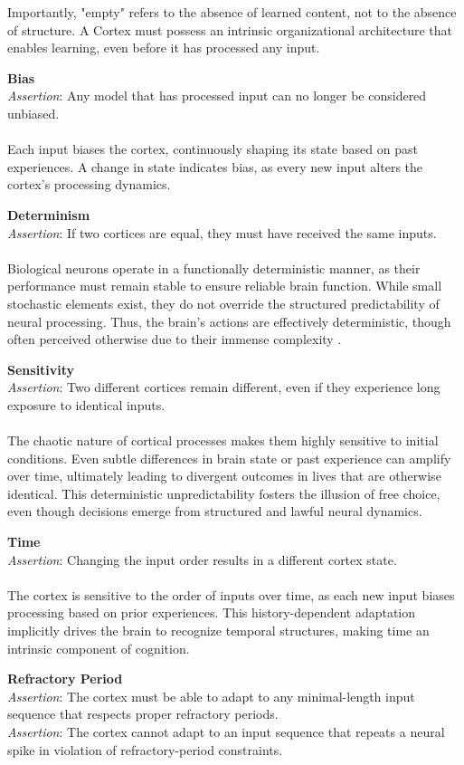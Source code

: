 \documentclass{article}
\newcommand{\agitbtest}[2]{
  \item
  \begin{minipage}[t]{\linewidth}
    \textbf{#1} \\[0.5ex]
    #2
  \end{minipage}
}
\begin{document}
\begin{agitblist}
{Importantly, "empty" refers to the absence of learned content, not to the absence of structure. A Cortex must possess an intrinsic organizational architecture that enables learning, even before it has processed any input.
}
\agitbtest{Bias}{
\emph{Assertion}: Any model that has processed input can no longer be considered unbiased.\\
\\
Each input biases the cortex, continuously shaping its state based on past experiences. A change in state indicates bias, as every new input alters the cortex's processing dynamics.
}
\agitbtest{Determinism}{
\emph{Assertion}: If two cortices are equal, they must have received the same inputs.\\
\\
Biological neurons operate in a functionally deterministic manner, as their performance must remain stable to ensure reliable brain function. While small stochastic elements exist, they do not override the structured predictability of neural processing. Thus, the brain's actions are effectively deterministic, though often perceived otherwise due to their immense complexity \cite{AtlanticFreeWill}.
}
\agitbtest{Sensitivity}{
\emph{Assertion}: Two different cortices remain different, even if they experience long exposure to identical inputs.\\
\\
The chaotic nature of cortical processes makes them highly sensitive to initial conditions. Even subtle differences in brain state or past experience can amplify over time, ultimately leading to divergent outcomes in lives that are otherwise identical. This deterministic unpredictability fosters the illusion of free choice, even though decisions emerge from structured and lawful neural dynamics.
}
\agitbtest{Time}{
\emph{Assertion}: Changing the input order results in a different cortex state.\\
\\
The cortex is sensitive to the order of inputs over time, as each new input biases processing based on prior experiences. This history-dependent adaptation implicitly drives the brain to recognize temporal structures, making time an intrinsic component of cognition.
}
\agitbtest{Refractory Period}{
\emph{Assertion}: The cortex must be able to adapt to any minimal-length input sequence that respects proper refractory periods.\\
\emph{Assertion}: The cortex cannot adapt to an input sequence that repeats a neural spike in violation of refractory-period constraints.\\
}
\end{agitblist}
\end{document}
